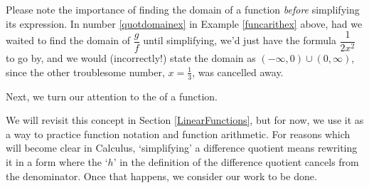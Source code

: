 \medskip

Please note the importance of finding the domain of a function \textit{before} simplifying its expression.  In number \ref{quotdomainex} in Example \ref{funcarithex} above, had we waited to find the domain of $\dfrac{g}{f}$ until  simplifying, we'd just have the formula $\dfrac{1}{2x^2}$ to go by, and we would (incorrectly!) state the domain as $(-\infty, 0) \cup (0,\infty)$, since the other troublesome number, $x = \frac{1}{3}$, was cancelled away.

Next, we turn our attention to the  of a function.  

\medskip



\medskip

We will revisit this concept in Section \ref{LinearFunctions}, but for now, we use it as a way to practice function notation and function arithmetic.  For reasons which will become clear in Calculus,  `simplifying' a difference quotient means rewriting it in a form where the `$h$' in the definition of the difference quotient cancels from the denominator. Once that happens, we consider our work to be done.

\medskip

